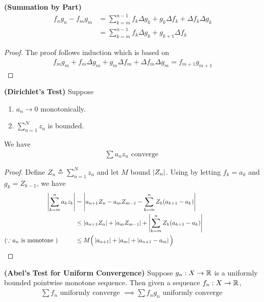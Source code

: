 \documentclass{report}
\begin{document}
\begin{theorem}
\label{Summation by Part}
\textbf{(Summation by Part)} 
\begin{align*}
  f_ng_n-f_mg_m&=\sum_{k=m}^{n-1}f_k \Delta g_k + g_k \Delta f_k+ \Delta f_k \Delta g_k \\
  &=\sum_{k=m}^{n-1}f_k \Delta g_k + g_{k+1}\Delta f_k
\end{align*}
\end{theorem}
\begin{proof}
The proof follows induction which is based on 
\begin{align*}
f_mg_m+ f_m\Delta g_m+ g_m \Delta f_m +\Delta f_m \Delta g_m=f_{m+1}g_{m+1}
\end{align*} 
\end{proof}
\begin{theorem}
\label{Dirichlet's Test}
\textbf{(Dirichlet's Test)} Suppose 
\begin{enumerate}[label=(\alph*)]
  \item $a_n\to 0$ monotonically. 
  \item $\sum_{n=1}^N z_n$ is bounded.
\end{enumerate}
We have 
\begin{align*}
\sum a_nz_n\text{ converge }
\end{align*}
\end{theorem}
\begin{proof}
Define $Z_n\triangleq \sum_{n=1}^N z_n$ and let $M$ bound  $\left|Z_n\right|$. Using  by letting $f_k=a_k$ and $g_k=Z_{k-1}$, we have
\begin{align*}
  \abso{\sum_{k=m}^{n}a_kz_k}&= \abso{a_{n+1}Z_n- a_mZ_{m-1}- \sum_{k=m}^n Z_k(a_{k+1}-a_k)}\\
                             &\leq \abso{a_{n+1}Z_n}+ \abso{a_mZ_{m-1}}+ \abso{\sum_{k=m}^n Z_k (a_{k+1}-a_k)}\\
  (\because a_n\text{ is monotone })\hspace{1cm}&\leq M\Big(\abso{a_{n+1}}+\abso{a_{m}}+\abso{a_{n+1}-a_m} \Big)\hspace{5cm}
\end{align*}
\end{proof}
\begin{theorem}
\label{Abel's Test for Uniform Convergence}
\textbf{(Abel's Test for Uniform Convergence)} Suppose $g_n:X\rightarrow \mathbb{R}$ is a uniformly bounded pointwise monotone sequence. Then given a sequence $f_n:X\rightarrow \mathbb{R}$, 
\begin{align*}
\sum f_n\text{ uniformly converge }\implies \sum f_ng_n\text{ uniformly converge }
\end{align*}
\end{theorem}
\end{document}
